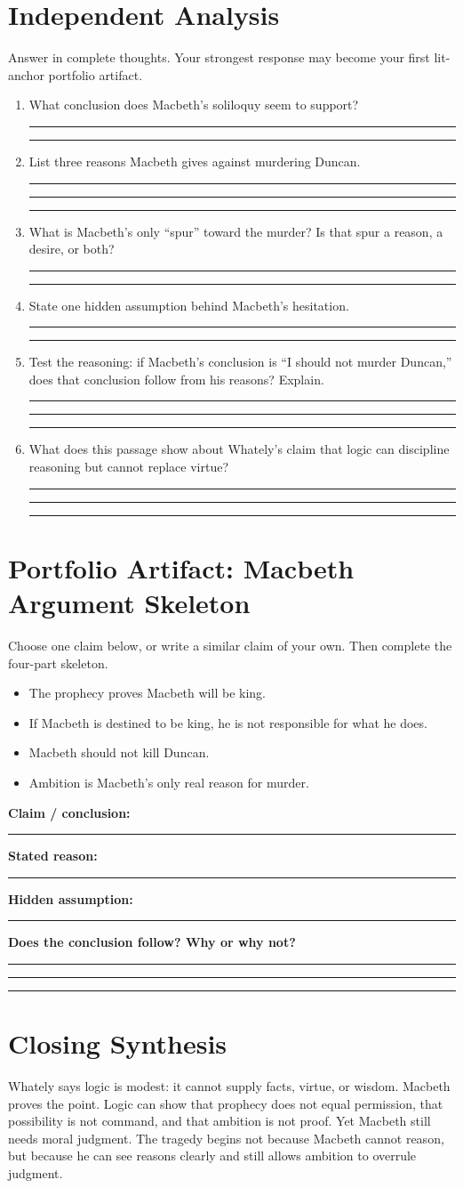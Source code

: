 \documentclass[12pt]{article}
\newcommand{\studentline}{\vspace{0.32em}\hrule\vspace{0.58em}}
\begin{document}
\section*{Independent Analysis}
Answer in complete thoughts. Your strongest response may become your first lit-anchor portfolio artifact.

\begin{enumerate}[leftmargin=*]
\item What conclusion does Macbeth's soliloquy seem to support?\studentline\studentline
\item List three reasons Macbeth gives against murdering Duncan.\studentline\studentline\studentline
\item What is Macbeth's only ``spur'' toward the murder? Is that spur a reason, a desire, or both?\studentline\studentline
\item State one hidden assumption behind Macbeth's hesitation.\studentline\studentline
\item Test the reasoning: if Macbeth's conclusion is ``I should not murder Duncan,'' does that conclusion follow from his reasons? Explain.\studentline\studentline\studentline
\item What does this passage show about Whately's claim that logic can discipline reasoning but cannot replace virtue?\studentline\studentline\studentline
\end{enumerate}

\section*{Portfolio Artifact: Macbeth Argument Skeleton}
Choose one claim below, or write a similar claim of your own. Then complete the four-part skeleton.

\begin{itemize}[leftmargin=*]
\item The prophecy proves Macbeth will be king.
\item If Macbeth is destined to be king, he is not responsible for what he does.
\item Macbeth should not kill Duncan.
\item Ambition is Macbeth's only real reason for murder.
\end{itemize}

\textbf{Claim / conclusion:}\studentline
\textbf{Stated reason:}\studentline
\textbf{Hidden assumption:}\studentline
\textbf{Does the conclusion follow? Why or why not?}\studentline\studentline\studentline

\section*{Closing Synthesis}
Whately says logic is modest: it cannot supply facts, virtue, or wisdom. Macbeth proves the point. Logic can show that prophecy does not equal permission, that possibility is not command, and that ambition is not proof. Yet Macbeth still needs moral judgment. The tragedy begins not because Macbeth cannot reason, but because he can see reasons clearly and still allows ambition to overrule judgment.
\end{document}

